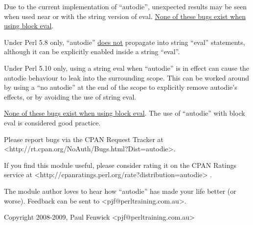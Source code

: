 \documentclass[]{article}
\renewcommand{\emph}[1]{\underline{#1}}
\begin{document}
Due to the current implementation of ``autodie'', unexpected results may
be seen when used near or with the string version of eval. \emph{None of
these bugs exist when using block eval}.

Under Perl 5.8 only, ``autodie'' \emph{does not} propagate into string
``eval'' statements, although it can be explicitly enabled inside a
string ``eval''.

Under Perl 5.10 only, using a string eval when ``autodie'' is in effect
can cause the autodie behaviour to leak into the surrounding scope. This
can be worked around by using a ``no autodie'' at the end of the scope
to explicitly remove autodie's effects, or by avoiding the use of string
eval.

\emph{None of these bugs exist when using block eval}. The use of
``autodie'' with block eval is considered good practice.


Please report bugs via the CPAN Request Tracker at
\textless{}http://rt.cpan.org/NoAuth/Bugs.html?Dist=autodie\textgreater{}.


If you find this module useful, please consider rating it on the CPAN
Ratings service at
\textless{}http://cpanratings.perl.org/rate?distribution=autodie\textgreater{}
.

The module author loves to hear how ``autodie'' has made your life
better (or worse). Feedback can be sent to
\textless{}pjf@perltraining.com.au\textgreater{}.


Copyright 2008-2009, Paul Fenwick
\textless{}pjf@perltraining.com.au\textgreater{}

\end{document}
